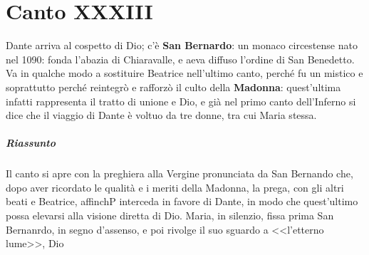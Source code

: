 \documentclass[a4paper, twoside, titlepage]{book}
\begin{document}
\chapter{Canto XXXIII}

Dante arriva al cospetto di Dio; c'è \textbf{San Bernardo}: un monaco circestense nato nel 1090: fonda l'abazia di Chiaravalle, e aeva diffuso l'ordine di San Benedetto.
Va in qualche modo a sostituire Beatrice nell'ultimo canto, perché fu un mistico e soprattutto perché reintegrò e rafforzò il culto della \textbf{Madonna}: quest'ultima infatti rappresenta il tratto di unione e Dio, e già nel primo canto dell'Inferno si dice che il viaggio di Dante è voltuo da tre donne, tra cui Maria stessa.

\paragraph{Riassunto} Il canto si apre con la preghiera alla Vergine pronunciata da San Bernando che, dopo aver ricordato le qualità e i meriti della Madonna, la prega, con gli altri beati e Beatrice, affinchP interceda in favore di Dante, in modo che quest'ultimo possa elevarsi alla visione diretta di Dio. Maria, in silenzio, fissa prima San Bernanrdo, in segno d'assenso, e poi rivolge il suo sguardo a <<l'etterno lume>>, Dio
\end{document}
